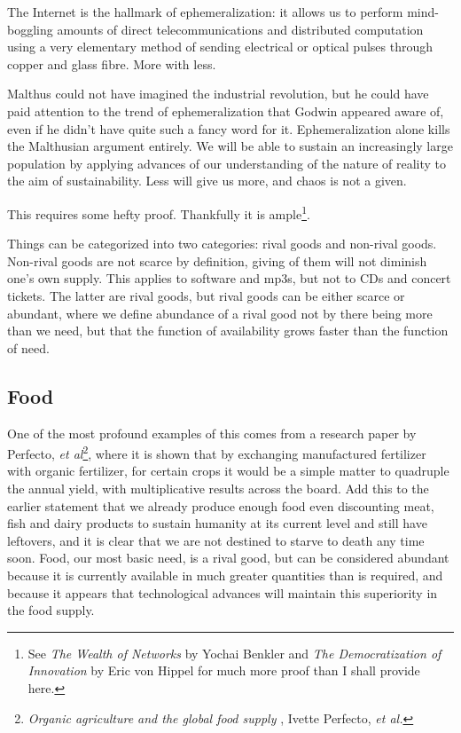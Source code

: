 The Internet is the hallmark of ephemeralization: it allows us to perform
mind-boggling amounts of direct telecommunications and distributed computation
using a very elementary method of sending electrical or optical pulses through
copper and glass f\hbox{}ibre. More with less.

Malthus could not have imagined the industrial revolution, but he could have
paid attention to the trend of ephemeralization that Godwin appeared aware of,
even if he didn't have quite such a fancy word for it. Ephemeralization alone
kills the Malthusian argument entirely. We will be able to sustain an
increasingly large population by applying advances of our understanding of the
nature of reality to the aim of sustainability. Less will give us more, and
chaos is not a given.

This requires some hefty proof. Thankfully it is ample\footnote{See \textit{The
Wealth of Networks} by Yochai Benkler and \textit{The Democratization of
Innovation} by Eric von Hippel for much more proof than I shall provide here.}.

Things can be categorized into two categories: rival goods and non-rival goods.
Non-rival goods are not scarce by def\hbox{}inition, giving of them will not
diminish one's own supply. This applies to software and mp3s, but not to CDs 
and concert tickets. The latter are rival goods, but rival goods can be either
scarce or abundant, where we def\hbox{}ine abundance of a rival good not by
there being more than we need, but that the function of availability grows
faster than the function of need.


\subsection{Food}
\label{s:artificial_scarcity:burning_bridges:food}

One of the most profound examples of this comes from a research paper by
Perfecto, \textit{et al}\footnote{\textit{Organic agriculture and the global
food supply} , Ivette Perfecto, \textit{et al.}}, where it is shown that by
exchanging manufactured fertilizer with organic fertilizer, for certain crops 
it would be a simple matter to quadruple the annual yield, with multiplicative
results across the board. Add this to the earlier statement that we already
produce enough food even discounting meat, f\hbox{}ish and dairy products to
sustain humanity at its current level and still have leftovers, and it is clear
that we are not destined to starve to death any time soon. Food, our most basic
need, is a rival good, but can be considered abundant because it is currently
available in much greater quantities than is required, and because it appears
that technological advances will maintain this superiority in the food supply. 

